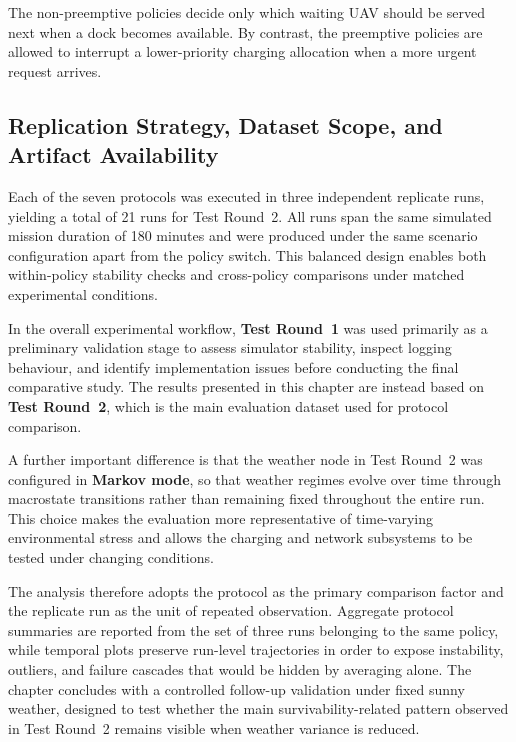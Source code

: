 The non-preemptive policies decide only which waiting UAV should be served next
when a dock becomes available. By contrast, the preemptive policies are allowed to
interrupt a lower-priority charging allocation when a more urgent request arrives.

\subsection{Replication Strategy, Dataset Scope, and Artifact Availability}
\label{sec:results:dataset-scope}

Each of the seven protocols was executed in three independent replicate runs,
yielding a total of 21 runs for Test Round~2. All runs span the same simulated
mission duration of 180 minutes and were produced under the same scenario
configuration apart from the policy switch. This balanced design enables both
within-policy stability checks and cross-policy comparisons under matched
experimental conditions.

In the overall experimental workflow, \textbf{Test Round~1} was used primarily as a
preliminary validation stage to assess simulator stability, inspect logging behaviour,
and identify implementation issues before conducting the final comparative study.
The results presented in this chapter are instead based on \textbf{Test Round~2},
which is the main evaluation dataset used for protocol comparison.

A further important difference is that the weather node in Test Round~2 was
configured in \textbf{Markov mode}, so that weather regimes evolve over time through
macrostate transitions rather than remaining fixed throughout the entire run. This
choice makes the evaluation more representative of time-varying environmental
stress and allows the charging and network subsystems to be tested under changing
conditions.

The analysis therefore adopts the protocol as the primary comparison factor and the
replicate run as the unit of repeated observation. Aggregate protocol summaries are
reported from the set of three runs belonging to the same policy, while temporal
plots preserve run-level trajectories in order to expose instability, outliers, and
failure cascades that would be hidden by averaging alone.
The chapter concludes with a controlled follow-up validation under fixed sunny
weather, designed to test whether the main survivability-related pattern observed in
Test Round~2 remains visible when weather variance is reduced.

